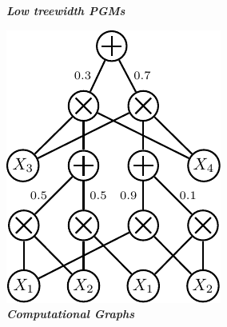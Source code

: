 \documentclass[xcolor={usenames,dvipsnames,svgnames}, compress]{beamer}
\newcommand{\cmark}{\ding{51}}%
\newcommand{\xmark}{\ding{55}}
\begin{document}
\begin{frame}[t]
\begin{center}
\begin{minipage}[t]{0.29\linewidth}
\begin{center}
        \textbf{\emph{\textcolor{tractable_green}{Low treewidth PGMs}}}\\[20pt]
      \end{center}
    \end{minipage}\hfill\begin{minipage}[t]{0.32\linewidth}
      \begin{center}
        \includegraphics[width=0.7\linewidth]{figures/spn}\\
        \textbf{\emph{\textcolor{tractable_green}{Computational Graphs}}}\\[20pt]
      \end{center}
    \end{minipage}\hfill\begin{minipage}[t]{0.29\linewidth}
      \begin{center}

\end{center}
\end{minipage}
\end{center}
\end{frame}
\end{document}
